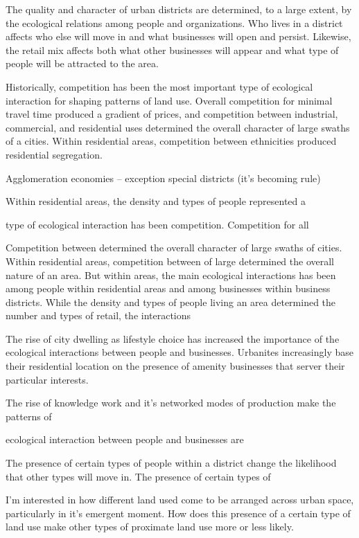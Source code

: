 \documentclass{article}
\begin{document}

The quality and character of urban districts are determined, to a
large extent, by the ecological relations among people and
organizations. Who lives in a district affects who else will move in
and what businesses will open and persist. Likewise, the retail mix
affects both what other businesses will appear and what type of people
will be attracted to the area.

Historically, competition has been the most important type of
ecological interaction for shaping patterns of land use. Overall
competition for minimal travel time produced a gradient of prices, and
competition between industrial, commercial, and residential uses
determined the overall character of large swaths of a cities. Within
residential areas, competition between ethnicities produced
residential segregation. 

Agglomeration economies -- exception special districts (it's becoming rule)

Within residential areas, the density and types of people represented
a 


type of ecological interaction has been
competition. Competition for all 

Competition between  determined the overall character of large swaths of
cities. Within residential areas, competition between of large determined the overall nature of an area. But within
areas, the main ecological interactions has been among people within
residential areas and among businesses within business
districts. While the density and types of people living an area
determined the number and types of retail, the interactions 


The rise of city dwelling as lifestyle choice has increased the
importance of the ecological interactions between people and
businesses. Urbanites increasingly base their residential location on the
presence of amenity businesses that server their particular
interests. 

The rise of knowledge work and it's networked modes of production
make the patterns of


ecological interaction between people and
businesses are 


The presence of certain types of people within a district
change the likelihood that other types will move in. The presence of
certain types of 

I'm interested in how different land used come to be arranged across
urban space, particularly in it's emergent moment. How does this
presence of a certain type of land use make other types of proximate
land use more or less likely. 
\end{document}
